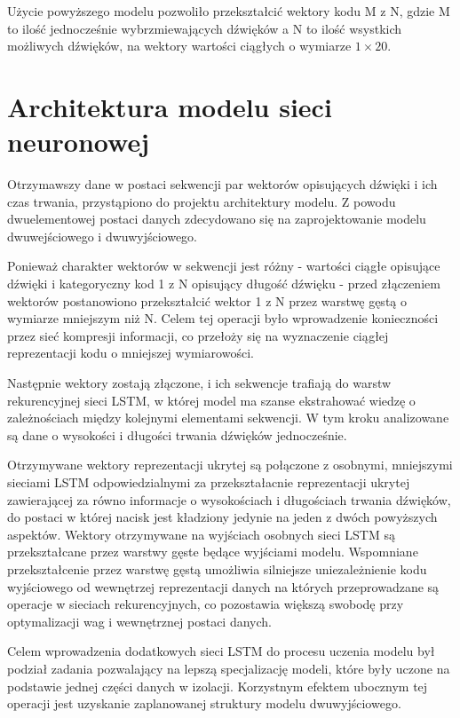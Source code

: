 {{        Użycie powyższego modelu pozwoliło przekształcić  wektory kodu  M\,\,z\,\,N, gdzie M to ilość jednocześnie wybrzmiewających dźwięków a N to ilość wsystkich możliwych dźwięków, na wektory wartości ciągłych o wymiarze \(1 \times 20\).
    }
    
    \section{Architektura modelu sieci neuronowej}\label{chap:main-model}
    {
        Otrzymawszy dane w postaci sekwencji par wektorów opisujących dźwięki i ich czas trwania,
        przystąpiono do projektu architektury modelu. Z powodu dwuelementowej postaci danych
        zdecydowano się na zaprojektowanie modelu dwuwejściowego i dwuwyjściowego.

        Ponieważ charakter wektorów w sekwencji jest różny - wartości ciągłe opisujące dźwięki i 
        kategoryczny kod  1\,\,z\,\,N opisujący długość dźwięku - przed złączeniem wektorów postanowiono 
        przekształcić wektor  1\,\,z\,\,N przez warstwę gęstą o wymiarze mniejszym niż N. Celem tej operacji
        było wprowadzenie konieczności przez sieć kompresji informacji, co przełoży się 
        na wyznaczenie ciągłej reprezentacji kodu o mniejszej wymiarowości. 

        Następnie wektory zostają złączone, i ich sekwencje trafiają do warstw rekurencyjnej sieci LSTM, w której model ma szanse ekstrahować wiedzę o zależnościach między kolejnymi elementami sekwencji. W tym kroku analizowane są dane o wysokości i długości trwania dźwięków jednocześnie.

        Otrzymywane wektory reprezentacji ukrytej są połączone z osobnymi, 
        mniejszymi sieciami LSTM odpowiedzialnymi za przekształacnie reprezentacji 
        ukrytej zawierającej za równo informacje o wysokościach i długościach trwania dźwięków, 
        do postaci w której nacisk jest kładziony jedynie na jeden z dwóch powyższych aspektów. 
        Wektory otrzymywane na wyjściach osobnych sieci LSTM są przekształcane przez warstwy gęste będące wyjściami modelu. 
        Wspomniane przekształcenie przez warstwę gęstą umożliwia silniejsze uniezależnienie kodu 
        wyjściowego od wewnętrzej reprezentacji danych na których przeprowadzane są operacje 
        w sieciach rekurencyjnych, co pozostawia większą swobodę przy optymalizacji wag i wewnętrznej postaci danych.
        
        Celem wprowadzenia dodatkowych sieci LSTM do procesu uczenia modelu był podział zadania pozwalający na lepszą specjalizację modeli, które były uczone na podstawie jednej części danych w izolacji. Korzystnym efektem ubocznym tej operacji jest uzyskanie zaplanowanej struktury modelu dwuwyjściowego.

}}
